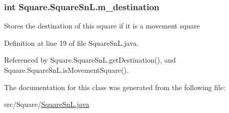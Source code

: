 \subsubsection[{m\+\_\+destination}]{\setlength{\rightskip}{0pt plus 5cm}int Square.\+Square\+Sn\+L.\+m\+\_\+destination\hspace{0.3cm}{\ttfamily [private]}}\label{class_square_1_1_square_sn_l_a1906be8d7e5ea28a4b5b1585d820186f}
Stores the destination of this square if it is a movement square 

Definition at line 19 of file Square\+Sn\+L.\+java.



Referenced by Square.\+Square\+Sn\+L.\+get\+Destination(), and Square.\+Square\+Sn\+L.\+is\+Movement\+Square().



The documentation for this class was generated from the following file\+:\begin{DoxyCompactItemize}
\item 
src/\+Square/\hyperlink{_square_sn_l_8java}{Square\+Sn\+L.\+java}\end{DoxyCompactItemize}
